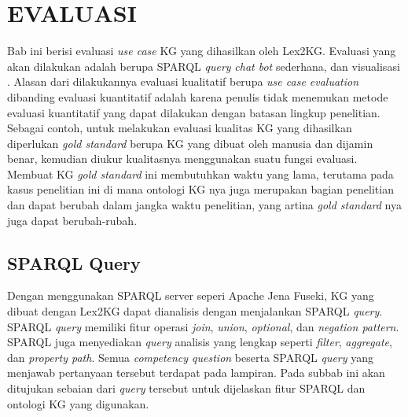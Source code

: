 \chapter{EVALUASI}
\label{chap:5}

Bab ini berisi evaluasi \textit{use case} KG yang dihasilkan oleh Lex2KG. Evaluasi yang akan
dilakukan adalah berupa SPARQL \textit{query} \textit{chat bot} sederhana, dan visualisasi \legal.
Alasan dari dilakukannya evaluasi kualitatif berupa \textit{use case evaluation} dibanding evaluasi
kuantitatif adalah karena penulis tidak menemukan metode evaluasi kuantitatif yang dapat dilakukan
dengan batasan lingkup penelitian. Sebagai contoh, untuk melakukan evaluasi kualitas KG yang
dihasilkan diperlukan \textit{gold standard} berupa KG yang dibuat oleh manusia dan dijamin benar,
kemudian diukur kualitasnya menggunakan suatu fungsi evaluasi. Membuat KG \textit{gold standard} ini
membutuhkan waktu yang lama, terutama pada kasus penelitian ini di mana ontologi KG nya juga
merupakan bagian penelitian dan dapat berubah dalam jangka waktu penelitian, yang artina
\textit{gold standard} nya juga dapat berubah-rubah.

\section{SPARQL Query}
\label{sec:sparq-query}

Dengan menggunakan SPARQL server seperi Apache Jena Fuseki, KG yang dibuat dengan Lex2KG dapat
dianalisis dengan menjalankan SPARQL \textit{query}. SPARQL \textit{query} memiliki fitur operasi
\textit{join}, \textit{union}, \textit{optional}, dan \textit{negation pattern}. SPARQL juga
menyediakan \textit{query} analisis yang lengkap seperti \textit{filter}, \textit{aggregate}, dan
\textit{property path}. Semua \textit{competency question} beserta SPARQL \textit{query} yang
menjawab pertanyaan tersebut terdapat pada lampiran. Pada subbab ini akan ditujukan sebaian dari
\textit{query} tersebut untuk dijelaskan fitur SPARQL dan ontologi KG yang digunakan.

